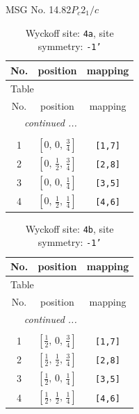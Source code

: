 \documentclass[fleqn,8pt]{jsarticle}
\begin{document}
\setcounter{MaxMatrixCols}{32}

\renewcommand{\tablename}{Table~}
\renewcommand{\figurename}{Figure~}
\begin{center}
\LARGE
MSG No. 14.82\quad$P_{c}2_{1}/c$
\end{center}
\renewcommand{\arraystretch}{1.2}
\begin{longtable}{ccc}
\caption{Wyckoff site: {\tt 4a}, site symmetry: {\tt -1'}}
 \\
 \hline \hline
No. & position & mapping \\ \hline \endfirsthead

\multicolumn{2}{l}{\tablename\ \thetable{}} \\
 \hline \hline
No. & position & mapping \\ \hline \endhead

 \hline \hline
\multicolumn{2}{r}{\footnotesize\it continued ...} \\ \endfoot

 \hline \hline
\multicolumn{2}{r}{} \\ \endlastfoot

1 & $\left[ 0,\, 0,\, \frac{3}{4} \right]$ & {\tt [1,7]} \\ \hline
2 & $\left[ 0,\, \frac{1}{2},\, \frac{3}{4} \right]$ & {\tt [2,8]} \\ \hline
3 & $\left[ 0,\, 0,\, \frac{1}{4} \right]$ & {\tt [3,5]} \\ \hline
4 & $\left[ 0,\, \frac{1}{2},\, \frac{1}{4} \right]$ & {\tt [4,6]} \\
\end{longtable}
\renewcommand{\arraystretch}{1.2}
\begin{longtable}{ccc}
\caption{Wyckoff site: {\tt 4b}, site symmetry: {\tt -1'}}
 \\
 \hline \hline
No. & position & mapping \\ \hline \endfirsthead

\multicolumn{2}{l}{\tablename\ \thetable{}} \\
 \hline \hline
No. & position & mapping \\ \hline \endhead

 \hline \hline
\multicolumn{2}{r}{\footnotesize\it continued ...} \\ \endfoot

 \hline \hline
\multicolumn{2}{r}{} \\ \endlastfoot

1 & $\left[ \frac{1}{2},\, 0,\, \frac{3}{4} \right]$ & {\tt [1,7]} \\ \hline
2 & $\left[ \frac{1}{2},\, \frac{1}{2},\, \frac{3}{4} \right]$ & {\tt [2,8]} \\ \hline
3 & $\left[ \frac{1}{2},\, 0,\, \frac{1}{4} \right]$ & {\tt [3,5]} \\ \hline
4 & $\left[ \frac{1}{2},\, \frac{1}{2},\, \frac{1}{4} \right]$ & {\tt [4,6]} \\
\end{longtable}
\end{document}
